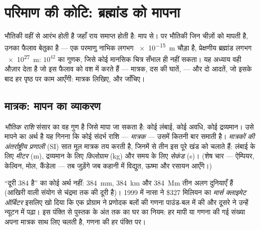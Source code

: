 \chapter{परिमाण की कोटि: ब्रह्मांड को मापना}\label{ch:g10:orders-of-magnitude}

भौतिकी वहीं से आरंभ होती है जहाँ राय समाप्त होती है: माप से। पर भौतिकी
जिन चीज़ों को मापती है, उनका फैलाव बेतुका है --- एक परमाणु नाभिक लगभग
\qty{e-15}{m} चौड़ा है, प्रेक्षणीय ब्रह्मांड लगभग \qty{e27}{m}: $10^{42}$ का
गुणक, जिसे कोई मानसिक चित्र सँभाल ही नहीं सकता। यह अध्याय वही औज़ार
देता है जो इस फैलाव को वश में करते हैं --- मात्रक, दस की घातें,
 --- और दो आदतें, जो इसके बाद हर पृष्ठ पर काम आएँगी:
मात्रक लिखिए, और  जाँचिए।

\section{मात्रक: मापन का व्याकरण}

\begin{definition}[भौतिक राशियाँ और SI मात्रक]\label{def:g10:orders-of-magnitude:unit}
\emph{भौतिक राशि} संसार का वह गुण है जिसे मापा जा
सकता है: कोई लंबाई, कोई अवधि, कोई द्रव्यमान। उसे मापने का अर्थ है यह
गिनना कि कोई संदर्भ राशि --- \emph{मात्रक} --- उसमें
कितनी बार समाती है। \emph{मात्रकों की अंतर्राष्ट्रीय
प्रणाली} (SI) सात मूल
मात्रक तय करती है, जिनमें से तीन इस पूरे खंड को चलाते हैं: लंबाई के लिए
\emph{मीटर} (\unit{m}), द्रव्यमान के लिए
\emph{किलोग्राम} (\unit{kg}) और समय के लिए
\emph{सेकंड} (\unit{s})। (शेष चार --- ऐम्पियर, केल्विन, मोल,
कैंडेला --- तब जुड़ेंगे जब कहानी में विद्युत, ऊष्मा और रसायन आएँगे।)
\end{definition}

\begin{remark}[मात्रक के बिना संख्या कोई परिणाम नहीं]\label{rem:g10:orders-of-magnitude:units}
``दूरी $384$ है'' का कोई अर्थ नहीं: \qty{384}{mm}, \qty{384}{km} और \qty{384}{Mm} तीन अलग
दुनियाएँ हैं (आखिरी वाली संयोग से चंद्रमा तक की दूरी है)। 1999 में नासा
ने \$327 मिलियन का \emph{मार्स क्लाइमेट ऑर्बिटर} इसलिए खो दिया कि एक
प्रोग्राम ने प्रणोदक बलों की गणना पाउंड-बल में की और दूसरे ने उन्हें
न्यूटन में पढ़ा। इस पंक्ति से पुस्तक के अंत तक का घर का नियम: हर मापी
या गणना की गई संख्या अपना मात्रक साथ लिए चलती है, गणना की हर
पंक्ति पर।
\end{remark}

